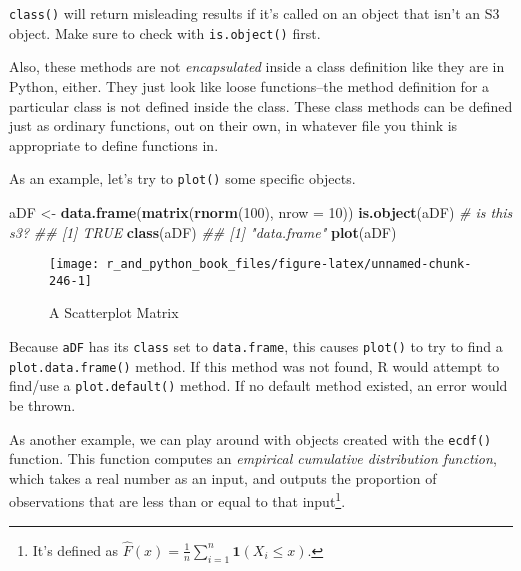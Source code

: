 \documentclass[12pt,krantz2]{krantz}
\makeatletter
\newenvironment{Shaded}{\begin{snugshade}}{\end{snugshade}}
\newcommand{\CommentTok}[1]{\textcolor[rgb]{0.37,0.37,0.37}{\textit{#1}}}
\newcommand{\DataTypeTok}[1]{\textcolor[rgb]{0.27,0.27,0.27}{#1}}
\newcommand{\DecValTok}[1]{\textcolor[rgb]{0.06,0.06,0.06}{#1}}
\newcommand{\KeywordTok}[1]{\textcolor[rgb]{0.27,0.27,0.27}{\textbf{#1}}}
\newcommand{\NormalTok}[1]{#1}
\newcommand{\StringTok}[1]{\textcolor[rgb]{0.5,0.5,0.5}{#1}}
\newenvironment{kframe}{%
\medskip{}
\setlength{\fboxsep}{.8em}
 \def\at@end@of@kframe{}%
 \ifinner\ifhmode%
  \def\at@end@of@kframe{\end{minipage}}%
  \begin{minipage}{\columnwidth}%
 \fi\fi%
 \def\FrameCommand##1{\hskip\@totalleftmargin \hskip-\fboxsep
 \colorbox{shadecolor}{##1}\hskip-\fboxsep
     \hskip-\linewidth \hskip-\@totalleftmargin \hskip\columnwidth}%
 \MakeFramed {\advance\hsize-\width
   \@totalleftmargin\z@ \linewidth\hsize
   \@setminipage}}%
 {\par\unskip\endMakeFramed%
 \at@end@of@kframe}
\renewenvironment{Shaded}{\begin{kframe}}{\end{kframe}}
\makeatother
\begin{document}
\begin{rmd-caution}
\texttt{class()} will return misleading results if it's called on an object that isn't an S3 object. Make sure to check with \texttt{is.object()} first.

\end{rmd-caution}

Also, these methods are not \emph{encapsulated} inside a class definition like they are in Python, either. They just look like loose functions--the method definition for a particular class is not defined inside the class. These class methods can be defined just as ordinary functions, out on their own, in whatever file you think is appropriate to define functions in.

As an example, let's try to \texttt{plot()} some specific objects.

\begin{Shaded}
\begin{Highlighting}[]
\NormalTok{aDF <-}\StringTok{ }\KeywordTok{data.frame}\NormalTok{(}\KeywordTok{matrix}\NormalTok{(}\KeywordTok{rnorm}\NormalTok{(}\DecValTok{100}\NormalTok{), }\DataTypeTok{nrow =} \DecValTok{10}\NormalTok{))}
\KeywordTok{is.object}\NormalTok{(aDF) }\CommentTok{# is this s3?}
\CommentTok{## [1] TRUE}
\KeywordTok{class}\NormalTok{(aDF)}
\CommentTok{## [1] "data.frame"}
\KeywordTok{plot}\NormalTok{(aDF)}
\end{Highlighting}
\end{Shaded}

\begin{figure}

{\centering \texttt{[image: r\_and\_python\_book\_files/figure-latex/unnamed-chunk-246-1]} 

}

\caption{A Scatterplot Matrix}\label{fig:unnamed-chunk-246}
\end{figure}

Because \texttt{aDF} has its \texttt{class} set to \texttt{data.frame}, this causes \texttt{plot()} to try to find a \texttt{plot.data.frame()} method. If this method was not found, R would attempt to find/use a \texttt{plot.default()} method. If no default method existed, an error would be thrown.

As another example, we can play around with objects created with the \texttt{ecdf()} function. This function computes an \emph{empirical cumulative distribution function}, which takes a real number as an input, and outputs the proportion of observations that are less than or equal to that input\footnote{It's defined as \(\hat{F}(x) = \frac{1}{n}\sum_{i=1}^n \mathbf{1}(X_i \le x)\).}.
\end{document}
